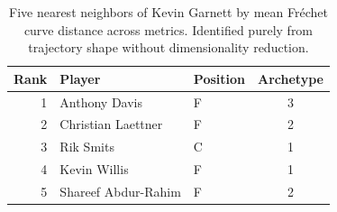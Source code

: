 \begin{table}[htbp]
  \centering\small
  \begin{tabular}{rllc}
    \toprule
    Rank & Player & Position & Archetype \\
    \midrule
    1 & Anthony Davis & F & 3 \\
    2 & Christian Laettner & F & 2 \\
    3 & Rik Smits & C & 1 \\
    4 & Kevin Willis & F & 1 \\
    5 & Shareef Abdur-Rahim & F & 2 \\
    \bottomrule
  \end{tabular}
  \caption{Five nearest neighbors of Kevin Garnett by mean Fr\'{e}chet curve distance across metrics. Identified purely from trajectory shape without dimensionality reduction.}
  \label{tab:Kevin_Garnett_frechet_curve_neighbors}
\end{table}

